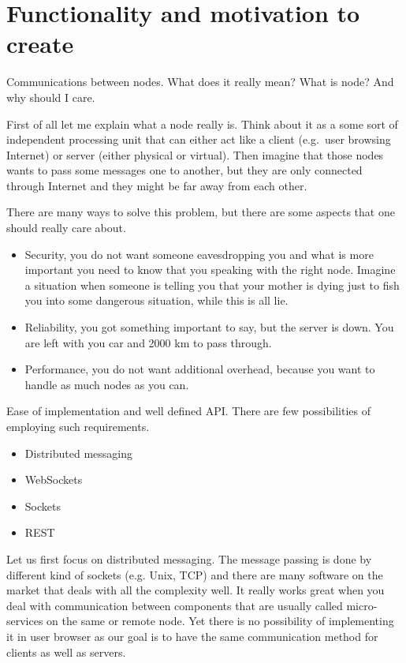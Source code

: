 \section{Functionality and motivation to create}
Communications between nodes. What does it really mean? What is node? And why should I care.

First of all let me explain what a node really is. Think about it as a some sort of independent processing unit that can either act like a client (e.g.\ user browsing Internet) or server (either physical or virtual). Then imagine that those nodes wants to pass some messages one to another, but they are only connected through Internet and they might be far away from each other.

There are many ways to solve this problem, but there are some aspects that one should really care about.


\begin{itemize}
\item Security, you do not want someone eavesdropping you and what is more important you need to know that you speaking with the right node. Imagine a situation when someone is telling you that your mother is dying just to fish you into some dangerous situation, while this is all lie.

\item Reliability, you got something important to say, but the server is down. You are left with you car and 2000 km to pass through.

\item Performance, you do not want additional overhead, because you want to handle as much nodes as you can.
\end{itemize}

Ease of implementation and well defined API\@. There are few possibilities of employing such requirements.
\begin{itemize}
\item Distributed messaging
\item WebSockets
\item Sockets
\item REST
\end{itemize}

Let us first focus on distributed messaging. The message passing is done by different kind of sockets (e.g. Unix, TCP) and there are many software on the market that deals with all the complexity well. It really works great when you deal with communication between components that are usually called micro-services on the same or remote node. Yet there is no possibility of implementing it in user browser as our goal is to have the same communication method for clients as well as servers.

